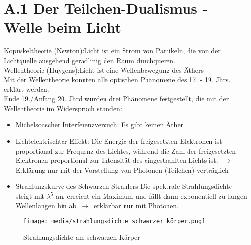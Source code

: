 \section{A.1 Der Teilchen-Dualismus - Welle beim Licht}

Kopuskeltheorie (Newton):\quad Licht ist ein Strom von Partikeln, die von der Lichtquelle ausgehend geradlinig den Raum durchqueren.\\

Wellentheorie (Huygens):\quad Licht ist eine Wellenbewegung des Äthers\\

Mit der Wellentheorie konnten alle optischen Phänomene des 17. - 19. Jhrs. erklärt werden.\\


Ende 19./Anfang 20. Jhrd wurden drei Phänomene festgestellt, die mit der Wellentheorie im Widerspruch standen:
\begin{itemize}
    \item Michelsonscher Interferenzversuch: Es gibt keinen Äther
    \item Lichtelektrischter Effekt:
        \subitem Die Energie der freigesetzten Elektronen ist proportional zur Frequenz des Lichtes, während die Zahl der freigesetzten Elektronen proportional zur Intensität des eingestrahlten Lichts ist.
        \subitem $\,\to\,$ Erklärung nur mit der Vorstellung von Photonen (Teilchen) verträglich

    \newpage
    \item Strahlungskurve des Schwarzen Strahlers
       {\color{red} \subitem Die spektrale Strahlungsdichte steigt mit $\lambda^5$ an, erreicht ein Maximum und fällt dann exponentiell zu langen Wellenlängen hin ab $\,\to\,$ erklärbar nur mit Photonen.}
\end{itemize}

\begin{figure}[h]
    \centering
    \texttt{[image: media/strahlungsdichte\_schwarzer\_körper.png]}
    \caption{Strahlungsdichte am schwarzen Körper}
    \label{fig:meine-grafik}
   \end{figure}
